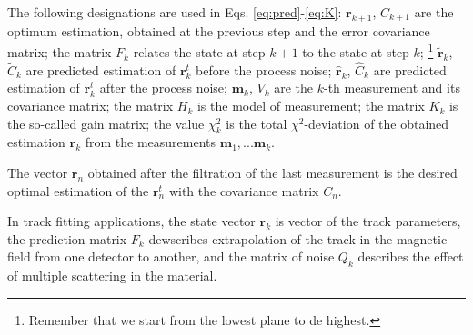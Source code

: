\documentclass[a4paper]{book}
\let\vec\mathbf  %
\begin{document}
The following designations are used in Eqs. \eqref{eq:pred}-\eqref{eq:K}: $\vec{r}_{k+1}$, $C_{k+1}$ are the optimum estimation, obtained at the previous step and the error covariance matrix; the matrix $F_k$ relates the state at step $k + 1$ to the state at step $k$; \footnote{Remember that we start from the lowest plane to de highest.} $\tilde{\vec{r}}_k$, $\tilde{C}_k$ are predicted estimation of $\vec{r}^t_k$ before the process noise; $\hat{\vec{r}}_k$, $\hat{C}_k$ are predicted estimation of $\vec{r}^t_k$ after the process noise; $\vec{m}_k$, $V_k$ are the $k$-th measurement and its covariance matrix; the matrix $H_k$ is the model of measurement; the matrix $K_k$ is the so-called gain matrix; the value $\chi^2_k$ is the total $\chi^2$-deviation of the obtained estimation $\vec{r}_k$ from the measurements $\vec{m}_1, ... \vec{m}_k$.

The vector $\vec{r}_n$ obtained after the filtration of the last measurement is the desired optimal estimation of the $\vec{r}^t_n$ with the covariance matrix $C_n$.

In track fitting applications, the state vector $\vec{r}_k$ is vector of the track parameters, the prediction matrix $F_k$ dewscribes extrapolation of the track in the magnetic field from one detector to another, and the matrix of noise $Q_k$ describes the effect of multiple scattering in the material.
\end{document}
